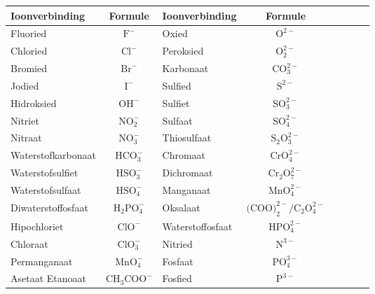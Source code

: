\begin{enumerate}[noitemsep, label=\textbf{\arabic*}. ]
\begin{table}[H]
\begin{center}
\label{tab:anions}
\begin{tabular}{|l|c|l|c|l|c|l|c|} \hline
\textbf{Ioonverbinding} & \textbf{Formule}            & \textbf{Ioonverbinding} & \textbf{Formule} \\ \hline
Fluoried                & $\text{F}^{-}$             & Oxied               & $\text{O}^{2-}$ \\ \hline
Chloried                & $\text{Cl}^{-}$            & Peroksied           & $\text{O}_{2}^{2-}$ \\ \hline
Bromied                 & $\text{Br}^{-}$            & Karbonaat           & $\text{CO}_{3}^{2-}$ \\ \hline
Jodied                  & $\text{I}^{-}$             & Sulfied             & $\text{S}^{2-}$ \\ \hline
Hidroksied              & $\text{OH}^{-}$            & Sulfiet             & $\text{SO}_{3}^{2-}$ \\ \hline
Nitriet                 & $\text{NO}_{2}^{-}$        & Sulfaat             & $\text{SO}_{4}^{2-}$ \\ \hline
Nitraat                 & $\text{NO}_{3}^{-}$        & Thiosulfaat         & $\text{S}_{2}{\text{O}}_{3}^{2-}$ \\ \hline
Waterstofkarbonaat      & $\text{HCO}_{3}^{-}$       & Chromaat            & $\text{CrO}_{4}^{2-}$ \\ \hline
Waterstofsulfiet        & $\text{HSO}_{3}^{-}$       & Dichromaat          & $\text{Cr}_{2}{\text{O}}_{7}^{2-}$ \\ \hline
Waterstofsulfaat        & $\text{HSO}_{4}^{-}$       & Manganaat           & $\text{MnO}_{4}^{2-}$ \\ \hline
Diwaterstoffosfaat      & $\text{H}_{2}{\text{PO}}_{4}^{-}$ & Oksalaat     & $\text{(COO)}_{2}^{2-}/{\text{C}}_{2}{\text{O}}_{4}^{2-}$ \\ \hline
Hipochloriet            & $\text{ClO}^{-}$           & Waterstoffosfaat    & $\text{HPO}_{4}^{2-}$ \\ \hline
Chloraat                & $\text{ClO}_{3}^{-}$       & Nitried             & $\text{N}^{3-}$ \\ \hline
Permanganaat            & $\text{MnO}_{4}^{-}$       & Fosfaat             & $\text{PO}_{4}^{3-}$ \\ \hline
Asetaat Etanoaat        & $\text{CH}_{3}{\text{COO}}^{-}$   & Fosfied      & $\text{P}^{3-}$ \\ \hline
\end{tabular}


\end{center}
\end{table}
\end{enumerate}
